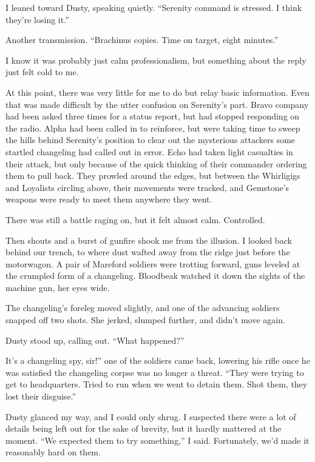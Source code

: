 I leaned toward Dusty, speaking quietly. “Serenity command is stressed. I think they’re losing it.”

Another transmission. “Brachinus copies. Time on target, eight minutes.”

I know it was probably just calm professionalism, but something about the reply just felt cold to me.

At this point, there was very little for me to do but relay basic information. Even that was made difficult by the utter confusion on Serenity’s part. Bravo company had been asked three times for a status report, but had stopped responding on the radio. Alpha had been called in to reinforce, but were taking time to sweep the hills behind Serenity’s position to clear out the mysterious attackers some startled changeling had called out in error. Echo had taken light casualties in their attack, but only because of the quick thinking of their commander ordering them to pull back. They prowled around the edges, but between the Whirligigs and Loyalists circling above, their movements were tracked, and Gemstone’s weapons were ready to meet them anywhere they went.

There was still a battle raging on, but it felt almost calm. Controlled.

Then shouts and a burst of gunfire shook me from the illusion. I looked back behind our trench, to where dust wafted away from the ridge just before the motorwagon. A pair of Mareford soldiers were trotting forward, guns leveled at the crumpled form of a changeling. Bloodbeak watched it down the sights of the machine gun, her eyes wide.

The changeling’s foreleg moved slightly, and one of the advancing soldiers snapped off two shots. She jerked, slumped further, and didn’t move again.

Dusty stood up, calling out. “What happened?”

\leavevmode{}It’s a changeling spy, sir!” one of the soldiers came back, lowering his rifle once he was satisfied the changeling corpse was no longer a threat. “They were trying to get to headquarters. Tried to run when we went to detain them. Shot them, they lost their disguise.”

Dusty glanced my way, and I could only shrug. I suspected there were a lot of details being left out for the sake of brevity, but it hardly mattered at the moment. “We expected them to try something,” I said. Fortunately, we’d made it reasonably hard on them.

